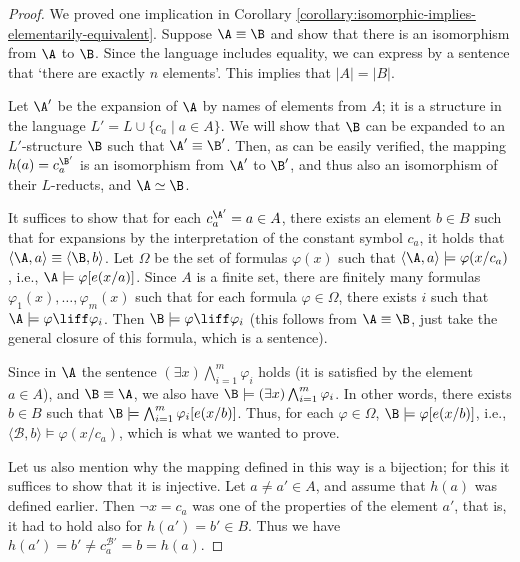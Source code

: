 \begin{proof}
    We proved one implication in Corollary \ref{corollary:isomorphic-implies-elementarily-equivalent}. Suppose $\A \equiv \B$ and show that there is an isomorphism from $\A$ to $\B$. Since the language includes equality, we can express by a sentence that `there are exactly $n$ elements'. This implies that $|A| = |B|$.

    Let $\A'$ be the expansion of $\A$ by names of elements from $A$; it is a structure in the language $L' = L \cup \{c_a \mid a \in A\}$. We will show that $\B$ can be expanded to an $L'$-structure $\B$ such that $\A' \equiv \B'$. Then, as can be easily verified, the mapping $h(a) = c_a^{\B'}$ is an isomorphism from $\A'$ to $\B'$, and thus also an isomorphism of their $L$-reducts, and $\A \simeq \B$.

    It suffices to show that for each $c_a^{\A'} = a \in A$, there exists an element $b \in B$ such that for expansions by the interpretation of the constant symbol $c_a$, it holds that $\langle \A, a \rangle \equiv \langle \B, b \rangle$. Let $\Omega$ be the set of formulas $\varphi(x)$ such that $\langle \A, a \rangle \models \varphi(x/c_a)$, i.e., $\A \models \varphi[e(x/a)]$. Since $A$ is a finite set, there are finitely many formulas $\varphi_1(x), \dots, \varphi_m(x)$ such that for each formula $\varphi \in \Omega$, there exists $i$ such that $\A \models \varphi \liff \varphi_i$. Then $\B \models \varphi \liff \varphi_i$ (this follows from $\A \equiv \B$, just take the general closure of this formula, which is a sentence).
    
    Since in $\A$ the sentence $(\exists x)\bigwedge_{i=1}^m \varphi_i$ holds (it is satisfied by the element $a \in A$), and $\B \equiv \A$, we also have $\B \models (\exists x)\bigwedge_{i=1}^m \varphi_i$. In other words, there exists $b \in B$ such that $\B \models \bigwedge_{i=1}^m \varphi_i[e(x/b)]$. Thus, for each $\varphi \in \Omega$, $\B \models \varphi[e(x/b)]$, i.e., $\langle \mathcal{B}, b \rangle \models \varphi(x/c_a)$, which is what we wanted to prove.

    Let us also mention why the mapping defined in this way is a bijection; for this it suffices to show that it is injective. Let $a\neq a'\in A$, and assume that $h(a)$ was defined earlier. Then $\neg x = c_a$ was one of the properties of the element $a'$, that is, it had to hold also for $h(a') = b' \in B$. Thus we have $h(a') = b' \neq c_a^{\mathcal B'} = b = h(a)$.
\end{proof}

